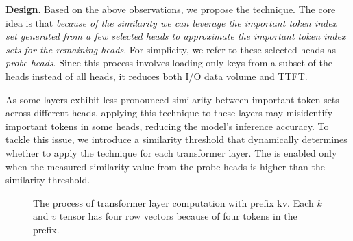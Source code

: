 



\textbf{Design}. Based on the above observations, we propose the \techa{} technique. The core idea is that \textit{because of the similarity we can leverage the important token index set generated from a few selected heads to approximate the important token index sets for the remaining heads}. For simplicity, we refer to these selected heads as \textit{probe heads}. Since this process involves loading only keys from a subset of the heads instead of all heads, it reduces both I/O data volume and TTFT.

As some layers exhibit less pronounced similarity between important token
sets across different heads, applying this technique to these layers may
misidentify important tokens in some heads, reducing the model's
inference accuracy. To tackle this issue, we introduce a similarity threshold
that dynamically determines whether to apply the technique
for each transformer layer.
The \techa{} is enabled only when the measured similarity value from the probe heads 
is higher than the similarity threshold.

\begin{figure}
	\centering
	\vspace{-0.1in}
	\caption{The process of transformer layer computation with prefix kv. Each \(k\) and \(v\) tensor has four row vectors because of four tokens in the prefix.}
	\label{fig:woandw-techa}
	\vspace{-0.1in}
\end{figure}



